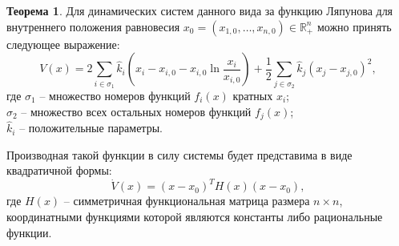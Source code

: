 \documentclass[12pt,a4paper]{extarticle}
\theoremstyle{definition}
\newtheorem{theorem}{Теорема}
\theoremstyle{definition}
\theoremstyle{definition}
\begin{document}
	\begin{theorem}
		Для динамических систем данного  вида за функцию Ляпунова для внутреннего положения равновесия $x_0=(x_{1,0},\dots,x_{n,0})\in\mathbb{R}^n_{+}$ можно принять следующее выражение:
		\[V(x)=2\sum\limits_{i\in\sigma_1}\hat{k}_i(x_i-x_{i,0}-x_{i,0}\ln\dfrac{x_i}{x_{i,0}})+\dfrac{1}{2}\sum\limits_{j\in\sigma_2}\hat{k}_j(x_j-x_{j,0})^2,\]
		где $\sigma_1$ -- множество номеров функций $f_i(x)$ кратных $x_i$;\\ 
		$\sigma_2$ -- множество всех остальных номеров функций $f_j(x)$;\\
		$\hat{k}_i$ -- положительные параметры. 
		
		Производная такой функции в силу системы будет представима в виде квадратичной формы:
		\[\dot{V}(x)=(x-x_0)^{T}H(x)(x-x_0),\]
		где $H(x)$ -- симметричная функциональная матрица размера $n\times n$, координатными функциями которой являются константы либо рациональные функции. 
	\end{theorem}
\end{document}
